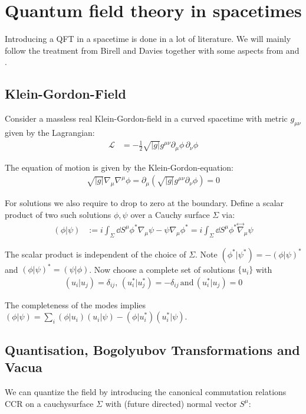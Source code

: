 \chapter{Quantum field theory in spacetimes}

Introducing a QFT in a spacetime is done in a lot of literature. We will mainly follow the treatment from Birell and Davies \cite{davies} together with some aspects from \cite{krishnan1011.5875} and \cite{Townsend}.    

\section{Klein-Gordon-Field}
Consider a massless real Klein-Gordon-field in a curved spacetime with metric \(g_{\mu\nu}\) given by the Lagrangian:
\begin{align}
\mathcal{L} &= -\frac{1}{2}\sqrt{|g|} g^{\mu\nu} \partial_\mu \phi\,\partial_\nu \phi 
\end{align}

The equation of motion is given by the Klein-Gordon-equation:
\begin{align}
\sqrt{|g|}\nabla_\mu\nabla^\mu \phi = \partial_\mu \left(\sqrt{|g|} g^{\mu\nu} \partial_\nu \phi\right) = 0
\end{align}

For solutions we also require to drop to zero at the boundary. Define a scalar product of two such solutions $\phi, \psi$ over a Cauchy surface \(\Sigma\) via:
\begin{align}
(\phi|\psi) &:= i \int_{\Sigma}\dd{S^\mu} \phi^*\nabla_\mu \psi - \psi\nabla_\mu \phi^* = i \int_{\Sigma} \dd{S^\mu} \phi^*\overset{\leftrightarrow}{\nabla}_\mu \psi
\end{align}

The scalar product is independent of the choice of \(\Sigma\)\cite{Townsend}. Note \((\phi^*|\psi^*) = -(\phi|\psi)^*\) and \((\phi|\psi)^* = (\psi|\phi)\). Now choose a complete set of solutions $\{u_i\}$ with
\begin{align}
(u_i| u_j) = \delta_{ij},\,(u_i^*| u_j^*) = -\delta_{ij}\,\text{and}\,(u_i^*| u_j) = 0
\end{align}

The completeness of the modes implies \((\phi|\psi) = \sum_i (\phi|u_i)(u_i|\psi) - (\phi|u_i^*)(u_i^*|\psi)\).

\section{Quantisation, Bogolyubov Transformations and Vacua}
\label{sec:qft_quantisation}
We can quantize the field by introducing the canonical commutation relations CCR on a cauchysurface \(\Sigma\) with (future directed) normal vector $S^\mu$\cite{krishnan1011.5875}:

